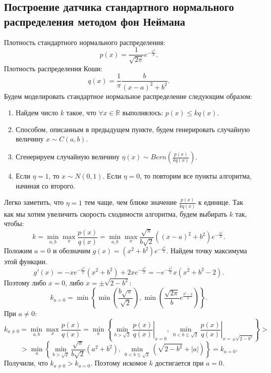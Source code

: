 \documentclass[a4paper, 11pt]{article}
\theoremstyle{def}
\theoremstyle{th}
\theoremstyle{rem}
\begin{document}
\subsection{Построение датчика стандартного нормального распределения методом фон Неймана}
Плотность стандартного нормального распределения:
$$
\displaystyle
p(x) = \frac{1}{\sqrt{2\pi}}e^{-\frac{x^2}{2}}.
$$
Плотность распределения Коши:
$$
\displaystyle
q(x) = \frac{1}{\pi}\frac{b}{(x-a)^2+b^2}.
$$
Будем моделировать стандартное нормальное распределение следующим образом:
\begin{enumerate}
    \item Найдем число $k$ такое, что $\forall x\in\mathbb{R}$ выполнялось: $p(x) \leqslant k q(x).$
    \item Способом, описанным в предыдущем пункте, будем генерировать случайную величину $x \sim  C(a, b)$.
    \item Сгенерируем случайную величину $\displaystyle \eta(x) \sim Bern\left(\frac{p(x)}{kq(x)}\right)$.
    \item Если $\eta = 1$, то $x \sim N(0, 1)$. Если $\eta = 0$, то повторим все пункты алгоритма, начиная со второго.
\end{enumerate}
Легко заметить, что $\eta = 1$ тем чаще, чем ближе значение $\displaystyle \frac{p(x)}{k q(x)}$ к единице. Так как мы хотим увеличить скорость сходимости алгоритма, будем выбирать $k$ так, чтобы:
$$
k = \min_{a, b}\max_{x}\frac{p(x)}{q(x)} = \min_{a, b}\max_{x} \frac{\sqrt{\pi}}{b\sqrt{2}}((x-a)^2 + b^2)e^{-\frac{x^2}{2}}.
$$
Положим $a=0$ и обозначим $g(x) = (x^2 + b^2)e^{-\frac{x^2}{2}}$. Найдем точку максимума этой функции.
$$
g'(x) = -xe^{-\frac{x^2}{2}}(x^2 + b^2) + 2 x e^{-\frac{x^2}{2}} = - e^{-\frac{x^2}{2}} x (x^2 + b^2 - 2).
$$
Поэтому либо $x=0$, либо $x = \pm \sqrt{2-b^2}$:
$$
\displaystyle
k_{a=0} = \min\left\{ \min \left(\frac{b\sqrt{\pi}}{\sqrt{2}}\right), \min \left(\frac{\sqrt{2\pi}}{b}e^\frac{b^2-2}{2}\right)\right\}.
$$
При $a \neq 0$:
$$
        k_{a \neq 0}
        = \min_{a, b}\max_{x}\frac{p(x)}{q(x)} = \min\limits_a \left\{
                \min\limits_{b > \sqrt{2}} \left.
                \frac{p(x)}{q(x)}
                \right|_{x = 0},\,
        \min\limits_{0 < b \leqslant \sqrt{2}} \left.
                \frac{p(x)}{q(x)}
                \right|_{x = \pm \sqrt{2 - b^2}}
        \right\}
        >
        $$
        $$
        >
        \min\limits_a \left\{
                \min\limits_{b > \sqrt{2}}
                \frac{\sqrt{\pi}}{b\sqrt{2}}(a^2 + b^2),\,
        \min\limits_{0 < b \leqslant \sqrt{2}} 
                (\sqrt{2 - b^2} + |a|)
        \right\} = k_{a=0}.
$$
Получили, что $k_{a \neq 0} > k_{a=0}$. Поэтому искомое $k$ достигается при $a=0$.
\end{document}
